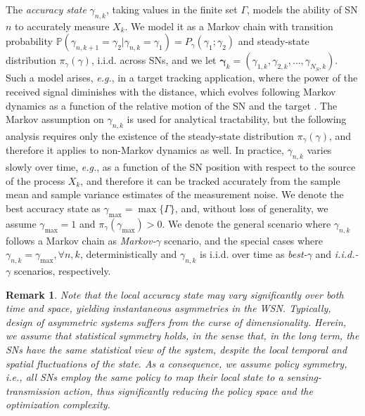 \documentclass[10pt,twocolumn,twoside]{IEEEtran}
\theoremstyle{plain}
\newtheorem{remark}{Remark}
\begin{document}
The \emph{accuracy state} $\gamma_{n,k}$, taking values in the finite set $\Gamma$, models the ability of SN $n$ to accurately measure $X_k$.
We model it as a Markov chain with transition probability $\mathbb P(\gamma_{n,k+1}{=}\gamma_2|\gamma_{n,k}{=}\gamma_1){=}P_\gamma(\gamma_1;\gamma_2)$ 
and steady-state distribution $\pi_{\gamma}(\gamma)$,
i.i.d. across SNs, and we let $\boldsymbol{\gamma}_k=(\gamma_{1,k},\gamma_{2,k},\dots,\gamma_{N_S,k})$.
{Such a model arises, \emph{e.g.}, in a target tracking application, where the power of the received signal diminishes with the distance, which 
evolves following Markov dynamics as a function of the relative motion of the SN and the target  \cite{Xiao}.
The Markov assumption on $\gamma_{n,k}$ is used for analytical tractability, but the following analysis requires only the existence of
the steady-state distribution $\pi_{\gamma}(\gamma)$, and therefore it applies to non-Markov dynamics as well.}
In practice, $\gamma_{n,k}$ varies slowly over time, \emph{e.g.}, as a function of the SN position with respect to the
source of the process $X_k$, and therefore it can be tracked accurately
 from the sample mean and sample variance estimates of the measurement noise. 
  We denote the best accuracy state as $\gamma_{\max}{=}\max\{\Gamma\}$,
and, without loss of generality, we assume $\gamma_{\max}{=}1$ and $\pi_{\gamma}(\gamma_{\max}){>}0$.
 We denote the general scenario where $\gamma_{n,k}$ follows a Markov chain as \emph{Markov-}$\gamma$ scenario,
and the special cases where $\gamma_{n,k}{=}\gamma_{\max},\forall n,k$,  deterministically 
and $\gamma_{n,k}$ is i.i.d. over time as \emph{best-}$\gamma$ and \emph{i.i.d.-}$\gamma$ scenarios, respectively.
\vspace{-3mm}
\begin{remark}
\label{rem22}
 Note that the local accuracy state may vary significantly over both time and space, yielding instantaneous \emph{asymmetries} in the WSN. Typically, design of 
 asymmetric systems suffers from the curse of dimensionality. Herein, we assume that \emph{statistical symmetry} holds, in the sense that, in the long term, the SNs have the same statistical view of the system, despite the local temporal and spatial fluctuations of the state. 
 As a consequence, we assume \emph{policy symmetry}, \emph{i.e.}, all SNs employ the same policy to map
 their local state to a sensing-transmission action, thus significantly reducing the policy space and the optimization complexity.
 \end{remark}
\end{document}
